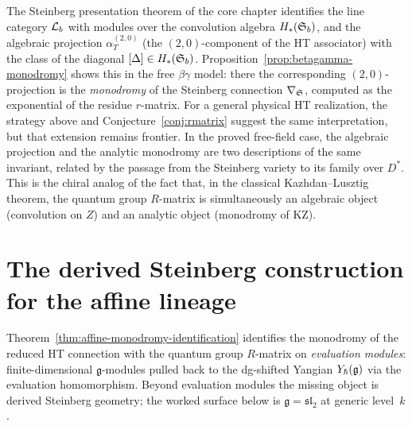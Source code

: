 \begin{remark}
\label{rmk:20-projection-origin}
The Steinberg presentation theorem of the core chapter identifies the line category $\cL_b$ with modules over the convolution algebra $H_*(\fS_b)$, and the algebraic projection $\alpha_T^{(2,0)}$ (the $(2,0)$-component of the HT associator) with the class of the diagonal $[\Delta] \in H_*(\fS_b)$.
Proposition~\ref{prop:betagamma-monodromy} shows this in the free $\beta\gamma$ model: there the corresponding $(2,0)$-projection is the \emph{monodromy} of the Steinberg connection $\nabla_{\fS}$, computed as the exponential of the residue $r$-matrix.
For a general physical HT realization, the strategy above and Conjecture~\ref{conj:rmatrix} suggest the same interpretation, but that extension remains frontier.
In the proved free-field case, the algebraic projection and the analytic monodromy are two descriptions of the same invariant, related by the passage from the Steinberg variety to its family over $D^*$.
This is the chiral analog of the fact that, in the classical Kazhdan--Lusztig theorem, the quantum group $R$-matrix is simultaneously an algebraic object (convolution on $Z$) and an analytic object (monodromy of KZ).
\end{remark}


\section{The derived Steinberg construction for the affine lineage}
\label{sec:derived-steinberg-affine}

\providecommand{\fg}{\mathfrak{g}}
\providecommand{\fh}{\mathfrak{h}}
\providecommand{\fn}{\mathfrak{n}}
\providecommand{\fb}{\mathfrak{b}}
\providecommand{\cL}{\mathcal{L}}
\providecommand{\cM}{\mathcal{M}}
\providecommand{\cO}{\mathcal{O}}
\providecommand{\fS}{\mathfrak{S}}

Theorem~\ref{thm:affine-monodromy-identification} identifies the
monodromy of the reduced HT connection with the quantum group
$R$-matrix on \emph{evaluation modules}: finite-dimensional
$\fg$-modules pulled back to the dg-shifted Yangian $Y_\h(\fg)$ via
the evaluation homomorphism. Beyond evaluation modules the missing
object is derived Steinberg geometry; the worked surface below is
$\fg=\mathfrak{sl}_2$ at generic level~$k$.


